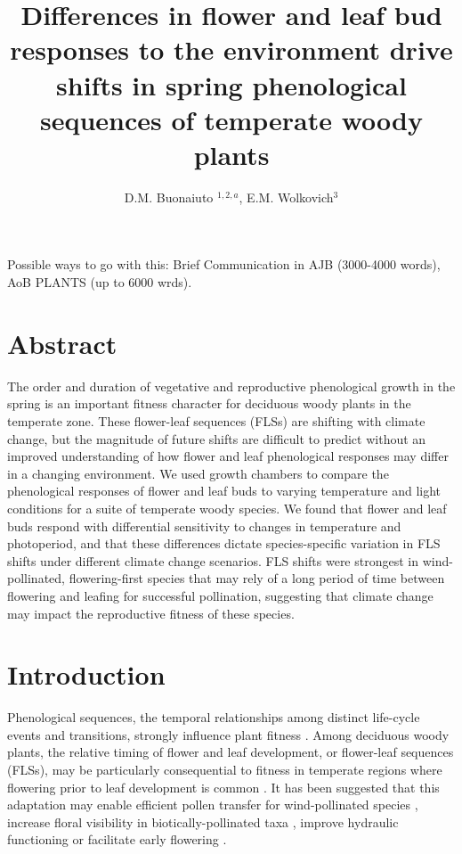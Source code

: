 \documentclass[11pt]{article}
\title{Differences in flower and leaf bud responses to the environment drive shifts in spring phenological sequences of temperate woody plants}\\
\date{}
\author{D.M. Buonaiuto $^{1,2,a}$, E.M. Wolkovich$^{3}$}
\begin{document}
\maketitle

Possible ways to go with this: Brief Communication in AJB (3000-4000 words),  AoB PLANTS (up to 6000 wrds). \\ 

\section*{Abstract}
The order and duration of vegetative and reproductive phenological growth in the spring is an important fitness character for deciduous woody plants in the temperate zone. These flower-leaf sequences (FLSs) are shifting with climate change, but the magnitude of future shifts are difficult to predict without an improved understanding of how flower and leaf phenological responses may differ in a changing environment. We used growth chambers to compare the phenological responses of flower and leaf buds to varying temperature and light conditions for a suite of temperate woody species. We found that flower and leaf buds respond with differential sensitivity to changes in temperature and photoperiod, and that these differences dictate species-specific variation in FLS shifts under different climate change scenarios. FLS shifts were strongest in wind-pollinated, flowering-first species that may rely of a long period of time between flowering and leafing for successful pollination, suggesting that climate change may impact the reproductive fitness of these species. 


\section*{Introduction}
\noindent  Phenological sequences, the temporal relationships among distinct life-cycle events and transitions, strongly influence plant fitness \citep{Ettinger2018,Post:2008aa}. Among deciduous woody plants, the relative timing of flower and leaf development, or flower-leaf sequences (FLSs), may be particularly consequential to fitness in temperate regions where flowering prior to leaf development is common \citep{Gougherty2018,Buonaiuto2020}. It has been suggested that this adaptation may enable efficient pollen transfer for wind-pollinated species \citep{Whitehead1969}, increase floral visibility in biotically-pollinated taxa \citep{Janzen1967}, improve hydraulic functioning \citep{Gougherty2018,Reich1984} or facilitate early flowering \citep{Primack1987}.\\
\end{document}
